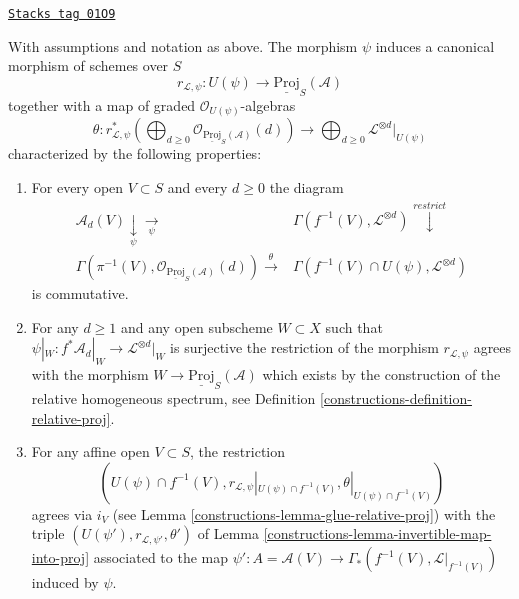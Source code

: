 \begin{lemma}
\label{constructions-lemma-invertible-map-into-relative-proj}
\href{https://stacks.math.columbia.edu/tag/01O9}{\texttt{Stacks tag 01O9}}

With assumptions and notation as above. The morphism
$\psi$ induces a canonical morphism of schemes over $S$
$$
r_{\mathcal{L}, \psi} :
U(\psi) \longrightarrow \underline{\text{Proj}}_S(\mathcal{A})
$$
together with a map of graded $\mathcal{O}_{U(\psi)}$-algebras
$$
\theta :
r_{\mathcal{L}, \psi}^*\left(
\bigoplus\nolimits_{d \geq 0}
\mathcal{O}_{\underline{\text{Proj}}_S(\mathcal{A})}(d)
\right)
\longrightarrow
\bigoplus\nolimits_{d \geq 0} \mathcal{L}^{\otimes d}|_{U(\psi)}
$$
characterized by the following properties:
\begin{enumerate}
\item For every open $V \subset S$ and every $d \geq 0$ the diagram
$$
\begin{array}{cc}\mathcal{A}_d(V) \underset{\psi}{\downarrow}\underset{\psi}{\longrightarrow} & \Gamma(f^{-1}(V), \mathcal{L}^{\otimes d}) \overset{restrict}{\downarrow} \\ \Gamma(\pi^{-1}(V),
\mathcal{O}_{\underline{\text{Proj}}_S(\mathcal{A})}(d)) \overset{\theta}{\longrightarrow} & \Gamma(f^{-1}(V) \cap U(\psi), \mathcal{L}^{\otimes d})\end{array}
$$
is commutative.
\item For any $d \geq 1$ and any open subscheme $W \subset X$
such that $\psi|_W : f^*\mathcal{A}_d|_W \to \mathcal{L}^{\otimes d}|_W$
is surjective the restriction of the morphism $r_{\mathcal{L}, \psi}$
agrees with the morphism $W \to \underline{\text{Proj}}_S(\mathcal{A})$
which exists by the construction of the relative homogeneous spectrum,
see Definition \ref{constructions-definition-relative-proj}.
\item For any affine open $V \subset S$, the restriction
$$
(U(\psi) \cap f^{-1}(V), r_{\mathcal{L}, \psi}|_{U(\psi) \cap f^{-1}(V)},
\theta|_{U(\psi) \cap f^{-1}(V)})
$$
agrees via $i_V$ (see Lemma \ref{constructions-lemma-glue-relative-proj}) with the triple
$(U(\psi'), r_{\mathcal{L}, \psi'}, \theta')$
of Lemma \ref{constructions-lemma-invertible-map-into-proj} associated to the map
$\psi' : A = \mathcal{A}(V) \to \Gamma_*(f^{-1}(V), \mathcal{L}|_{f^{-1}(V)})$
induced by $\psi$.
\end{enumerate}
\end{lemma}

